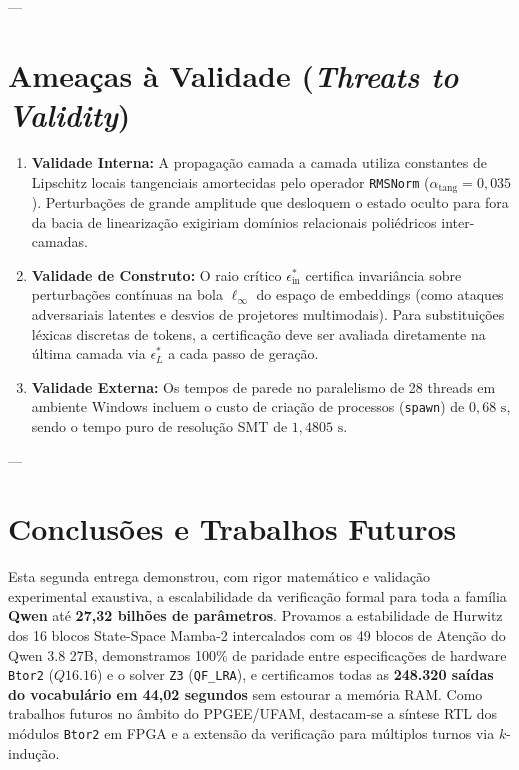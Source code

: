 \documentclass[11pt,a4paper]{article}
\theoremstyle{definition}
\begin{document}
---

\section{Ameaças à Validade (\textit{Threats to Validity})}

\begin{enumerate}
    \item \textbf{Validade Interna:} A propagação camada a camada utiliza constantes de Lipschitz locais tangenciais amortecidas pelo operador \texttt{RMSNorm} ($\alpha_{\text{tang}} = 0{,}035$). Perturbações de grande amplitude que desloquem o estado oculto para fora da bacia de linearização exigiriam domínios relacionais poliédricos inter-camadas.
    \item \textbf{Validade de Construto:} O raio crítico $\epsilon_{\text{in}}^*$ certifica invariância sobre perturbações contínuas na bola $\ell_\infty$ do espaço de embeddings (como ataques adversariais latentes e desvios de projetores multimodais). Para substituições léxicas discretas de tokens, a certificação deve ser avaliada diretamente na última camada via $\epsilon_L^*$ a cada passo de geração.
    \item \textbf{Validade Externa:} Os tempos de parede no paralelismo de 28 threads em ambiente Windows incluem o custo de criação de processos (\texttt{spawn}) de $0{,}68\text{ s}$, sendo o tempo puro de resolução SMT de $1{,}4805\text{ s}$.
\end{enumerate}

---

\section{Conclusões e Trabalhos Futuros}

Esta segunda entrega demonstrou, com rigor matemático e validação experimental exaustiva, a escalabilidade da verificação formal para toda a família \textbf{Qwen} até \textbf{27,32 bilhões de parâmetros}. Provamos a estabilidade de Hurwitz dos 16 blocos State-Space Mamba-2 intercalados com os 49 blocos de Atenção do Qwen 3.8 27B, demonstramos 100\% de paridade entre especificações de hardware \texttt{Btor2} ($Q16.16$) e o solver \texttt{Z3} (\texttt{QF\_LRA}), e certificamos todas as \textbf{248.320 saídas do vocabulário em 44,02 segundos} sem estourar a memória RAM. Como trabalhos futuros no âmbito do PPGEE/UFAM, destacam-se a síntese RTL dos módulos \texttt{Btor2} em FPGA e a extensão da verificação para múltiplos turnos via $k$-indução.
\end{document}
